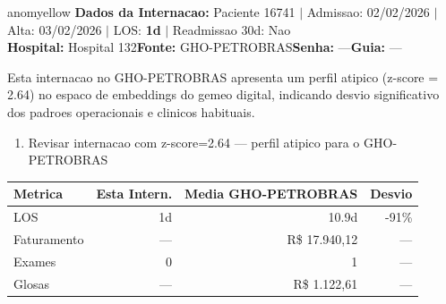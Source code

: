 \documentclass[a4paper,10pt]{article}
\begin{document}
\begin{anomalycard}[Internacao 163931 | GHO-PETROBRAS | MODERADO (z=2.64)]{anomyellow}
\textbf{Dados da Internacao:} Paciente 16741 $\mid$ Admissao: 02/02/2026 $\mid$ Alta: 03/02/2026 $\mid$ LOS: \textbf{1d} $\mid$ Readmissao 30d: Nao\\
\textbf{Hospital:} Hospital 132\quad\textbf{Fonte:} GHO-PETROBRAS\quad\textbf{Senha:} ---\quad\textbf{Guia:} ---\\
\vspace{2pt}\begin{tcolorbox}[colback=severityred!20,colframe=anomyellow,title={\textbf{Interpretacao de Negocio}},fonttitle=\bfseries\small,left=4pt,right=4pt,top=3pt,bottom=3pt]
{\small Esta internacao no GHO-PETROBRAS apresenta um perfil atipico (z-score = 2.64) no espaco de embeddings do gemeo digital, indicando desvio significativo dos padroes operacionais e clinicos habituais.}
\end{tcolorbox}
\begin{tcolorbox}[colback=severityyellow!30,colframe=anomorange,title={\textbf{Recomendacoes Especificas}},fonttitle=\bfseries\small,left=4pt,right=4pt,top=3pt,bottom=3pt]
\begin{enumerate}[nosep,leftmargin=16pt]
\item {\small Revisar internacao com z-score=2.64 --- perfil atipico para o GHO-PETROBRAS}
\end{enumerate}
\end{tcolorbox}
\begin{center}\begin{tabular}{l r r r}\toprule\textbf{Metrica} & \textbf{Esta Intern.} & \textbf{Media GHO-PETROBRAS} & \textbf{Desvio} \\\midrule
LOS & 1d & 10.9d & -91\% \\
Faturamento & --- & R\$ 17.940,12 & --- \\
Exames & 0 & 1 & --- \\
Glosas & --- & R\$ 1.122,61 & --- \\
\bottomrule\end{tabular}\end{center}


\end{anomalycard}
\end{document}
